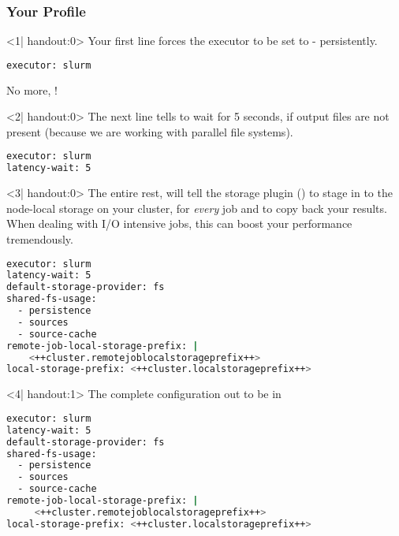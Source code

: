 \begin{frame}[fragile]
  \frametitle{Your Profile}
    \begin{onlyenv}<1| handout:0>
      Your first line forces the executor to be set to \slurm - persistently.
      \begin{lstlisting}[language=Bash, style=Shell]
executor: slurm
     \end{lstlisting}
     No more, !
   \end{onlyenv}
   \begin{onlyenv}<2| handout:0>
   	 The next line tells \Snakemake to wait for 5 seconds, if output files are not present (because we are working with parallel file systems). 
   	 \begin{lstlisting}[language=Bash, style=Shell]
executor: slurm
latency-wait: 5
   	 \end{lstlisting}
    \end{onlyenv}
    \begin{onlyenv}<3| handout:0>
      The entire rest, will tell the storage plugin () to stage in to the node-local storage on your cluster, for \emph{every} job and to copy back your results. When dealing with I/O intensive jobs, this can boost your performance tremendously. 
      \begin{lstlisting}[language=Bash, style=Shell]
executor: slurm
latency-wait: 5
default-storage-provider: fs
shared-fs-usage:
  - persistence
  - sources
  - source-cache
remote-job-local-storage-prefix: |
    <++cluster.remotejoblocalstorageprefix++>
local-storage-prefix: <++cluster.localstorageprefix++>
    \end{lstlisting}
   \end{onlyenv}
   \begin{onlyenv}<4| handout:1>
   	The complete configuration out to be in 
   	\begin{lstlisting}[language=Bash, style=Shell]
executor: slurm
latency-wait: 5
default-storage-provider: fs
shared-fs-usage:
  - persistence
  - sources
  - source-cache
remote-job-local-storage-prefix: |
     <++cluster.remotejoblocalstorageprefix++>
local-storage-prefix: <++cluster.localstorageprefix++>
    \end{lstlisting}
  \end{onlyenv}
\end{frame}


